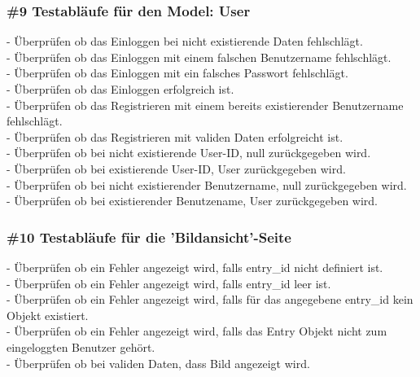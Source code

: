 \subsubsection*{\#9 Testabläufe für den Model: User}
- Überprüfen ob das Einloggen bei nicht existierende Daten fehlschlägt.\\
- Überprüfen ob das Einloggen mit einem falschen Benutzername fehlschlägt.\\
- Überprüfen ob das Einloggen mit ein falsches Passwort fehlschlägt.\\
- Überprüfen ob das Einloggen erfolgreich ist.\\
- Überprüfen ob das Registrieren mit einem bereits existierender Benutzername fehlschlägt.\\
- Überprüfen ob das Registrieren mit validen Daten erfolgreicht ist.\\
- Überprüfen ob bei nicht existierende User-ID, null zurückgegeben wird.\\
- Überprüfen ob bei existierende User-ID, User zurückgegeben wird.\\
- Überprüfen ob bei nicht existierender Benutzername, null zurückgegeben wird.\\
- Überprüfen ob bei existierender Benutzename, User zurückgegeben wird.

\subsubsection*{\#10 Testabläufe für die 'Bildansicht'-Seite}
- Überprüfen ob ein Fehler angezeigt wird, falls entry\_id nicht definiert ist.\\
- Überprüfen ob ein Fehler angezeigt wird, falls entry\_id leer ist.\\
- Überprüfen ob ein Fehler angezeigt wird, falls für das angegebene entry\_id kein Objekt existiert.\\
- Überprüfen ob ein Fehler angezeigt wird, falls das Entry Objekt nicht zum eingeloggten Benutzer gehört.\\
- Überprüfen ob bei validen Daten, dass Bild angezeigt wird.